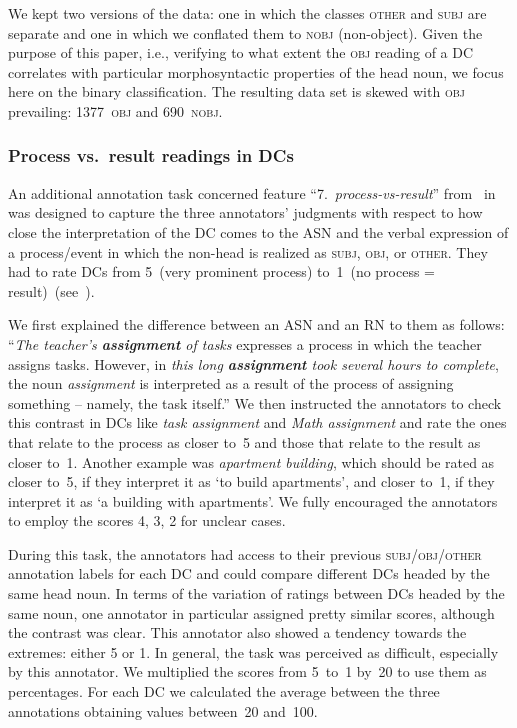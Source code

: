 \documentclass[output=paper]{langsci/langscibook}
\begin{document}
We kept two versions of the data: one in which  {the classes} \textsc{other} and \textsc{subj} are separate and one in which we conflated them to \textsc{nobj} (non-object). Given the purpose of this paper, i.e., verifying to what extent the \textsc{obj} reading of a DC correlates with particular morphosyntactic properties of the head noun, we focus here on the binary classification. The resulting data set is skewed with \textsc{obj} prevailing: 1377~\textsc{obj} and 690~\textsc{nobj}.

\subsubsection{Process vs.\ result readings in DCs}\label{sec:annotation:p-r}\largerpage
An additional annotation task concerned feature ``7.~\textit{process-vs-result}'' from~ in  was designed to capture the three annotators' judgments with respect to how close the interpretation of the DC comes to the ASN and the verbal expression of a process/event in which the non-head is realized as \textsc{subj}, \textsc{obj}, or \textsc{other}.
They had to rate DCs from 5~(very prominent process) to~1~(no process = result)~(see~\citealt{grimshaw:90}). 

We first explained the difference between an ASN and an RN to them as follows: ``\textit{The teacher's \textbf{assignment} of tasks} expresses a process in which the teacher assigns tasks.
However, in \textit{this long \textbf{assignment} took several hours to complete}, the noun \textit{assignment} is interpreted as a result of the process of assigning something -- namely, the task itself.''
We then instructed the annotators to check this contrast in DCs like \textit{task assignment} and \textit{Math assignment} and rate the ones that relate to the process as closer to~5 and those that relate to the result as closer to~1. Another example was \textit{apartment building}, which should be rated as closer to~5, if they interpret it as \lq to build apartments\rq, and closer to~1, if they  interpret it as \lq a building with apartments\rq. We fully encouraged the annotators to employ the scores 4, 3, 2 for unclear cases. 
 
During this task, the annotators had access to their previous  {\textsc{subj}/\textsc{obj}/\textsc{other} annotation} labels  for each DC and could compare different DCs headed by the same head noun. In terms of the variation of ratings between DCs headed by the same noun, one annotator in particular assigned pretty similar scores, although the contrast was clear. This annotator also showed a  tendency towards the extremes: either 5 or 1. In general, the task was perceived as difficult, especially by this annotator. We multiplied the scores from 5~to~1 by~20 to use them as percentages. For each DC we calculated the average between the three annotations obtaining values between~20 and~100. 
 
\end{document}
